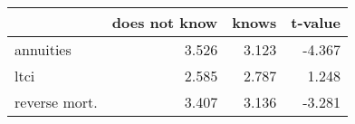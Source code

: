 \begin{tabular}{lrrr}
\toprule
{} &  does not know &  knows &  t-value \\
\midrule
annuities     &          3.526 &  3.123 &   -4.367 \\
ltci          &          2.585 &  2.787 &    1.248 \\
reverse mort. &          3.407 &  3.136 &   -3.281 \\
\bottomrule
\end{tabular}

